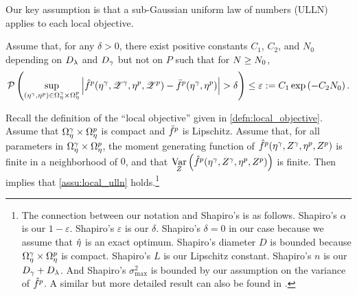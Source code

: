 Our key assumption is that a sub-Gaussian uniform law of numbers (ULLN) applies
to each local objective.
%
\begin{assu}
\label{assu:local_ulln}
%
Assume that, for any $\delta > 0$, there exist positive constants $C_1$, $C_2$,
and $N_0$ depending on $D_{\lambda}$ and $D_{\gamma}$ but not on $P$ such that for
$N \ge N_0$,
%
\begin{align*}
%
\p\left(
\sup_{\left( \eta^\gamma, \eta^p \right) \in \etadom^{\gamma} \times \etadom^p}
\abs{\fhat^p(\eta^\gamma, \Z^\gamma, \eta^p, \Z^p) -
     \fbar^p(\eta^\gamma, \eta^p)} > \delta
\right)
\le
\varepsilon := C_1 \exp\left(-C_2 N_0 \right).
%
\end{align*}
%
\end{assu}
%
%
%
\begin{example}\label{ex:ulln_compact}
%
Recall the definition of the ``local objective'' given in
\cref{defn:local_objective}.  
Assume that $\Omega_{\eta}^{\gamma} \times \Omega_{\eta}^p$ is compact and $\bar{f}^p$ is
Lipschitz. Assume that, for all parameters in $\Omega_{\eta}^{\gamma} \times
\Omega_{\eta}^p$, the moment generating function of $\hat{f}^p(\eta^\gamma, Z^\gamma,
\eta^p, Z^p)$ is finite in a neighborhood of $0$, and that
$\underset{Z}{\mathrm{Var}}\left(\hat{f}^p(\eta^\gamma, Z^\gamma, \eta^p, Z^p)\right)$ is finite. Then
\citet[Theorem 12 and Equation 3.17]{shapiro:2003:montecarlosampling} implies that
\cref{assu:local_ulln} holds.\footnote{The connection between our notation and
Shapiro's is as follows. Shapiro's $\alpha$ is our $1 - \varepsilon$. Shapiro's
$\varepsilon$ is our $\delta$. Shapiro's $\delta = 0$ in our case because we
assume that $\hat{\eta}$ is an exact optimum. Shapiro's diameter $D$ is bounded
because $\Omega_{\eta}^{\gamma} \times \Omega_{\eta}^p$ is compact. Shapiro's $L$ is our
Lipschitz constant. Shapiro's $n$ is our $D_{\gamma} + D_{\lambda}$. And Shapiro's
$\sigma^2_{\textrm{max}}$ is bounded by our assumption on the variance of
$\hat{f}^p$.  A similar but more detailed result can also be found in
\citet[Section 5.3.2]{shapiro:2021:lectures}.}
%
\end{example}
